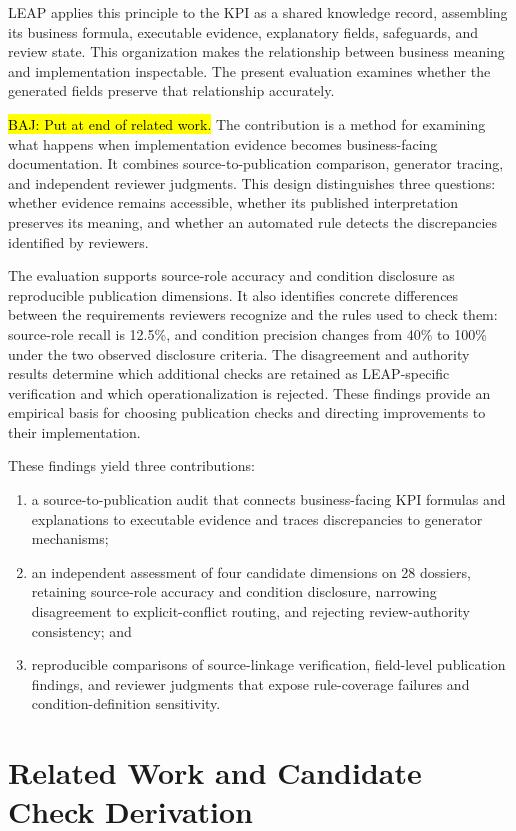 \documentclass[a4paper,fleqn]{cas-dc}
\newcommand{\baj}[1]{{\sethlcolor{yellow}\hl{BAJ: #1}}}
\begin{document}
LEAP applies this principle to the KPI as a shared knowledge record, assembling its business formula, executable evidence, explanatory fields, safeguards, and review state. This organization makes the relationship between business meaning and implementation inspectable. The present evaluation examines whether the generated fields preserve that relationship accurately.

\baj{Put at end of related work.}
The contribution is a method for examining what happens when implementation evidence becomes business-facing documentation. It combines source-to-publication comparison, generator tracing, and independent reviewer judgments. This design distinguishes three questions: whether evidence remains accessible, whether its published interpretation preserves its meaning, and whether an automated rule detects the discrepancies identified by reviewers.

The evaluation supports source-role accuracy and condition disclosure as reproducible publication dimensions. It also identifies concrete differences between the requirements reviewers recognize and the rules used to check them: source-role recall is 12.5\%, and condition precision changes from 40\% to 100\% under the two observed disclosure criteria. The disagreement and authority results determine which additional checks are retained as LEAP-specific verification and which operationalization is rejected. These findings provide an empirical basis for choosing publication checks and directing improvements to their implementation.

These findings yield three contributions:
\begin{enumerate}[leftmargin=*]
\item a source-to-publication audit that connects business-facing KPI formulas and explanations to executable evidence and traces discrepancies to generator mechanisms;
\item an independent assessment of four candidate dimensions on 28 dossiers, retaining source-role accuracy and condition disclosure, narrowing disagreement to explicit-conflict routing, and rejecting review-authority consistency; and
\item reproducible comparisons of source-linkage verification, field-level publication findings, and reviewer judgments that expose rule-coverage failures and condition-definition sensitivity.
\end{enumerate}
\section{Related Work and Candidate Check Derivation}
\end{document}
